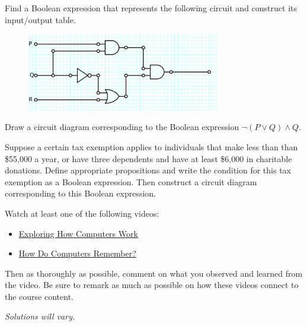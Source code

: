 \documentclass[11pt,letterpaper]{article}
\begin{document}
\newpage



 Find a Boolean expression that represents the following circuit and construct its input/output table.
	\begin{figure}[!ht]
	\centering
	\includegraphics[width=0.75\textwidth]{circuit.png}
	\end{figure} \pspace

\sol 



\newpage



 Draw a circuit diagram corresponding to the Boolean expression $\neg (P \vee Q) \wedge Q$. \pspace

\sol 



\newpage



 Suppose a certain tax exemption applies to individuals that make less than than \$55,000 a year, or have three dependents and have at least \$6,000 in charitable donations. Define appropriate propositions and write the condition for this tax exemption as a Boolean expression. Then construct a circuit diagram corresponding to this Boolean expression. \pspace

\sol 



\newpage



 Watch at least one of the following videos:
	\begin{itemize}
	\item \href{https://www.youtube.com/watch?v=QZwneRb-zqA&ab_channel=SebastianLague}{Exploring How Computers Work}
	\item \href{https://www.youtube.com/watch?v=I0-izyq6q5s&ab_channel=SebastianLague}{How Do Computers Remember?}
	\end{itemize}
Then as thoroughly as possible, comment on what you observed and learned from the video. Be sure to remark as much as possible on how these videos connect to the course content. \pspace

\vfill
\begin{center} {\itshape Solutions will vary.} \end{center}
\vfill
\end{document}
